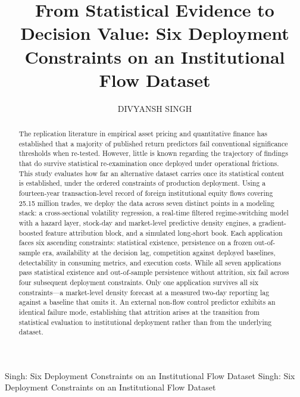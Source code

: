 \documentclass{ieeeaccess}
\begin{document}

\title{From Statistical Evidence to Decision Value: Six Deployment Constraints on an Institutional Flow Dataset}

\author{\uppercase{Divyansh Singh}}
\address[1]{Independent Researcher, India (e-mail: divyanshsinghpost@gmail.com)}

\markboth
{Singh: Six Deployment Constraints on an Institutional Flow Dataset}
{Singh: Six Deployment Constraints on an Institutional Flow Dataset}


\begin{abstract}
The replication literature in empirical asset pricing and quantitative finance has established that a majority of published return predictors fail conventional significance thresholds when re-tested. However, little is known regarding the trajectory of findings that do survive statistical re-examination once deployed under operational frictions. This study evaluates how far an alternative dataset carries once its statistical content is established, under the ordered constraints of production deployment. Using a fourteen-year transaction-level record of foreign institutional equity flows covering 25.15 million trades, we deploy the data across seven distinct points in a modeling stack: a cross-sectional volatility regression, a real-time filtered regime-switching model with a hazard layer, stock-day and market-level predictive density engines, a gradient-boosted feature attribution block, and a simulated long-short book. Each application faces six ascending constraints: statistical existence, persistence on a frozen out-of-sample era, availability at the decision lag, competition against deployed baselines, detectability in consuming metrics, and execution costs. While all seven applications pass statistical existence and out-of-sample persistence without attrition, six fail across four subsequent deployment constraints. Only one application survives all six constraints---a market-level density forecast at a measured two-day reporting lag against a baseline that omits it. An external non-flow control predictor exhibits an identical failure mode, establishing that attrition arises at the transition from statistical evaluation to institutional deployment rather than from the underlying dataset.
\end{abstract}
\end{document}
